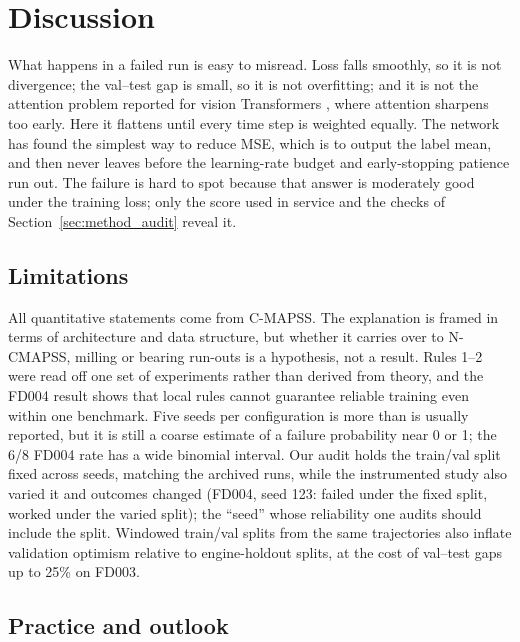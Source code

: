 \section{Discussion}
\label{sec:discussion}

What happens in a failed run is easy to misread. Loss falls smoothly, so it
is not divergence; the val--test gap is small, so it is not overfitting; and
it is not the attention problem reported for vision Transformers
\cite{zhai2023stabilizing}, where attention sharpens too early. Here it
flattens until every time step is weighted equally. The network has found
the simplest way to reduce MSE, which is to output the label mean, and then
never leaves before the learning-rate budget and early-stopping patience run
out. The failure is hard to spot because that answer is moderately good
under the training loss; only the score used in service and the checks of
Section~\ref{sec:method_audit} reveal it.

\subsection{Limitations}

All quantitative statements come from C-MAPSS. The explanation is framed in
terms of architecture and data structure, but whether it carries over to
N-CMAPSS, milling or bearing run-outs is a hypothesis, not a result. Rules
1--2 were read off one set of experiments rather than derived from theory,
and the FD004 result shows that local rules cannot guarantee reliable
training even within one benchmark. Five seeds per configuration is more
than is usually reported, but it is still a coarse estimate of a failure
probability near 0 or 1; the 6/8 FD004 rate has a wide binomial interval.
Our audit holds the train/val split fixed across seeds, matching the
archived runs, while the instrumented study also varied it and outcomes
changed (FD004, seed 123: failed under the fixed split, worked under the
varied split); the ``seed'' whose reliability one audits should include the
split. Windowed train/val splits from the same trajectories also inflate
validation optimism relative to engine-holdout splits, at the cost of
val--test gaps up to 25\% on FD003.

\subsection{Practice and outlook}

